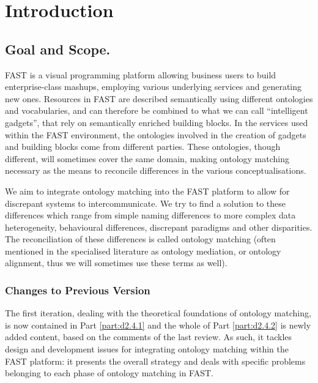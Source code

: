 \documentclass{fast_latex}
\begin{document}
\section{Introduction} %
\label{sec:intro}
\subsection{Goal and Scope.}
FAST is a visual programming platform allowing business users to build enterprise-class mashups, employing various underlying services and generating new ones. Resources in FAST are described semantically using different ontologies and vocabularies, and can therefore be combined to what we can call ``intelligent gadgets'', that rely on semantically enriched building blocks. In the services used within the FAST environment, the ontologies involved in the creation of gadgets and building blocks come from different parties. These ontologies, though different, will sometimes cover the same domain, making ontology matching necessary as the means to reconcile differences in the various conceptualisations.

We aim to integrate ontology matching into the FAST platform to allow for discrepant systems to intercommunicate.  We try to find a solution to these differences which range from simple naming differences to more complex data heterogeneity, behavioural differences, discrepant paradigms and other disparities. The reconciliation of these differences is called ontology matching (often mentioned in the specialised literature as ontology mediation, or ontology alignment, thus we will sometimes use these terms as well). 

\subsubsection{Changes to Previous Version}

The first iteration, dealing with the theoretical foundations of ontology matching, is now contained in Part \ref{part:d2.4.1} and the whole of Part \ref{part:d2.4.2} is newly added content, based on the comments of the last review. As such, it tackles design and development issues for integrating ontology matching within the FAST platform: it presents the overall strategy and deals with specific problems belonging to each phase of ontology matching in FAST.
\end{document}
